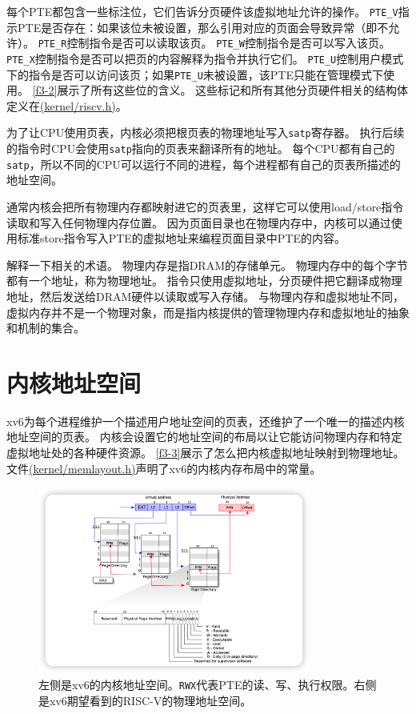 每个PTE都包含一些标注位，它们告诉分页硬件该虚拟地址允许的操作。
\texttt{PTE\_V}指示PTE是否存在：如果该位未被设置，那么引用对应的页面会导致异常（即不允许）。
\texttt{PTE\_R}控制指令是否可以读取该页。
\texttt{PTE\_W}控制指令是否可以写入该页。
\texttt{PTE\_X}控制指令是否可以把页的内容解释为指令并执行它们。
\texttt{PTE\_U}控制用户模式下的指令是否可以访问该页；如果\texttt{PTE\_U}未被设置，该PTE只能在管理模式下使用。
\autoref{f3-2}展示了所有这些位的含义。
这些标记和所有其他分页硬件相关的结构体定义在\href{https://github.com/mit-pdos/xv6-riscv/blob/riscv//kernel/riscv.h}{(kernel/riscv.h)}。

为了让CPU使用页表，内核必须把根页表的物理地址写入\texttt{satp}寄存器。
执行后续的指令时CPU会使用\texttt{satp}指向的页表来翻译所有的地址。
每个CPU都有自己的\texttt{satp}，所以不同的CPU可以运行不同的进程，每个进程都有自己的页表所描述的地址空间。

通常内核会把所有物理内存都映射进它的页表里，这样它可以使用load/store指令读取和写入任何物理内存位置。
因为页面目录也在物理内存中，内核可以通过使用标准store指令写入PTE的虚拟地址来编程页面目录中PTE的内容。

解释一下相关的术语。
物理内存是指DRAM的存储单元。
物理内存中的每个字节都有一个地址，称为物理地址。
指令只使用虚拟地址，分页硬件把它翻译成物理地址，然后发送给DRAM硬件以读取或写入存储。
与物理内存和虚拟地址不同，虚拟内存并不是一个物理对象，而是指内核提供的管理物理内存和虚拟地址的抽象和机制的集合。

\section{内核地址空间}
xv6为每个进程维护一个描述用户地址空间的页表，还维护了一个唯一的描述内核地址空间的页表。
内核会设置它的地址空间的布局以让它能访问物理内存和特定虚拟地址处的各种硬件资源。
\autoref{f3-3}展示了怎么把内核虚拟地址映射到物理地址。
文件\href{URL}{(kernel/memlayout.h)}声明了xv6的内核内存布局中的常量。

\begin{figure}[htbp]
    \centering
    \includegraphics[width=0.8\textwidth]{../imgs/f3-2.png}
    \caption{左侧是xv6的内核地址空间。\texttt{RWX}代表PTE的读、写、执行权限。右侧是xv6期望看到的RISC-V的物理地址空间。}
    \label{f3-3}
\end{figure}

